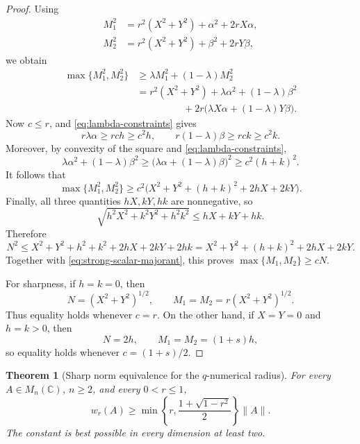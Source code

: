 \documentclass[11pt]{article}
\newtheorem{theorem}{Theorem}[section]
\theoremstyle{remark}
\newcommand{\C}{\mathbb C}
\begin{document}
\begin{proof}
Using
\[
 \begin{split}
 M_1^2&=r^2(X^2+Y^2)+\alpha^2+2rX\alpha,\\
 M_2^2&=r^2(X^2+Y^2)+\beta^2+2rY\beta,
 \end{split}
\]
we obtain
\begin{align*}
 \max\{M_1^2,M_2^2\}
 &\geq \lambda M_1^2+(1-\lambda)M_2^2\\
 &=r^2(X^2+Y^2)
   +\lambda\alpha^2+(1-\lambda)\beta^2\\
 &\hspace{2cm}
   +2r\bigl(\lambda X\alpha+(1-\lambda)Y\beta\bigr).
\end{align*}
Now \(c\leq r\), and \eqref{eq:lambda-constraints} gives
\[
 r\lambda\alpha\geq rch\geq c^2h,
 \qquad
 r(1-\lambda)\beta\geq rck\geq c^2k.
\]
Moreover, by convexity of the square and
\eqref{eq:lambda-constraints},
\[
 \lambda\alpha^2+(1-\lambda)\beta^2
 \geq\bigl(\lambda\alpha+(1-\lambda)\beta\bigr)^2
 \geq c^2(h+k)^2.
\]
It follows that
\begin{equation}
\label{eq:strong-scalar-majorant}
 \max\{M_1^2,M_2^2\}
 \geq c^2\bigl(
 X^2+Y^2+(h+k)^2+2hX+2kY
 \bigr).
\end{equation}
Finally, all three quantities \(hX,kY,hk\) are nonnegative, so
\[
 \sqrt{h^2X^2+k^2Y^2+h^2k^2}
 \leq hX+kY+hk.
\]
Therefore
\[
 N^2
 \leq X^2+Y^2+h^2+k^2+2hX+2kY+2hk
 =X^2+Y^2+(h+k)^2+2hX+2kY.
\]
Together with \eqref{eq:strong-scalar-majorant}, this proves
\(\max\{M_1,M_2\}\geq cN\).

For sharpness, if \(h=k=0\), then
\[
 N=(X^2+Y^2)^{1/2},
 \qquad
 M_1=M_2=r(X^2+Y^2)^{1/2}.
\]
Thus equality holds whenever \(c=r\).  On the other hand, if
\(X=Y=0\) and \(h=k>0\), then
\[
 N=2h,
 \qquad
 M_1=M_2=(1+s)h,
\]
so equality holds whenever \(c=(1+s)/2\).
\end{proof}
 
\begin{theorem}[Sharp norm equivalence for the \(q\)-numerical radius]
\label{thm:q-radius-norm}
For every \(A\in M_n(\C)\), \(n\geq2\), and every \(0<r\leq1\),
\[
 w_r(A)\geq
 \min\left\{r,\frac{1+\sqrt{1-r^2}}2\right\}\|A\|.
\]
The constant is best possible in every dimension at least two.
\end{theorem}
\end{document}
